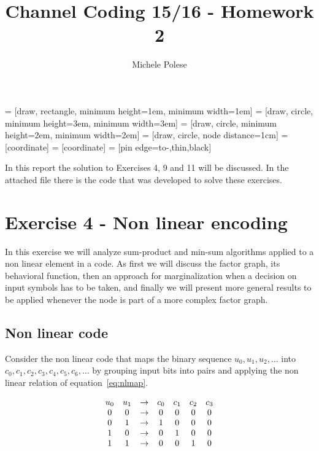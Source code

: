 \documentclass[10pt]{article}
\begin{document}
\title{Channel Coding 15/16 - Homework 2}
\author{Michele Polese}

\maketitle

 = [draw, rectangle, 
    minimum height=1em, minimum width=1em]
 = [draw, circle, minimum height=3em, minimum width=3em]
 = [draw, circle, minimum height=2em, minimum width=2em]
 = [draw, circle, node distance=1cm]
 = [coordinate]
 = [coordinate]
 = [pin edge={to-,thin,black}]

In this report the solution to Exercises 4, 9 and 11 will be discussed. In the attached file there is the code that was developed to solve these exercises.


\section*{Exercise 4 - Non linear encoding}
In this exercise we will analyze sum-product and min-sum algorithms applied to a non linear element in a code. As first we will discuss the factor graph, its behavioral function, then an approach for marginalization when a decision on input symbols has to be taken, and finally we will present more general results to be applied whenever the node is part of a more complex factor graph.

\subsection*{Non linear code}
Consider the non linear code that maps the binary sequence $u_0, u_1, u_2, \dots$ into $c_0, c_1, c_2, c_3, c_4, c_5, c_6, \dots$ by grouping input bits into pairs and applying the non linear relation of equation~\eqref{eq:nlmap}.

\begin{equation}\label{eq:nlmap}
\centering
	\begin{array} {ccccccc}
		u_0 & u_1 & \rightarrow & c_0 & c_1 & c_2 & c_3 \\
		0 & 0 & \rightarrow & 0 & 0 & 0 & 0 \\
		0 & 1 & \rightarrow & 1 & 0 & 0 & 0 \\
		1 & 0 & \rightarrow & 0 & 1 & 0 & 0 \\
		1 & 1 & \rightarrow & 0 & 0 & 1 & 0 \\
	\end{array}
\end{equation}
\end{document}
